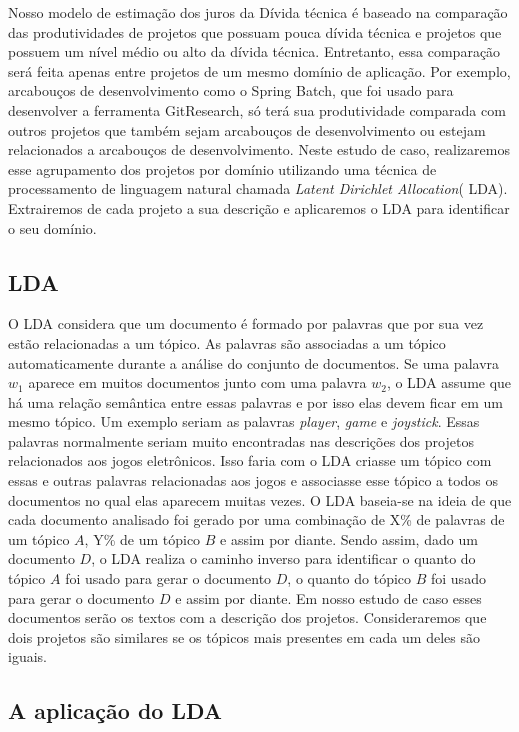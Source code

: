 Nosso modelo de estimação dos juros da Dívida técnica é baseado na comparação das produtividades de projetos que possuam pouca dívida técnica e projetos que possuem um nível médio ou alto da dívida técnica. Entretanto, essa comparação será feita apenas entre projetos de um mesmo domínio de aplicação. Por exemplo, arcabouços de desenvolvimento como o Spring Batch\cite{cogoluegnes2011spring}, que foi usado para desenvolver a ferramenta GitResearch, só terá sua produtividade comparada com outros projetos que também sejam arcabouços de desenvolvimento ou estejam relacionados a arcabouços de desenvolvimento.  Neste estudo de caso, realizaremos esse agrupamento dos projetos por domínio utilizando uma técnica de processamento de linguagem natural chamada \textit{Latent Dirichlet Allocation}( LDA). Extrairemos de cada projeto a sua descrição e aplicaremos o LDA para identificar o seu domínio.

\subsection{LDA}

O LDA considera que um documento é formado por palavras que por sua vez estão relacionadas a um tópico.  As palavras são associadas a um tópico automaticamente durante a análise do conjunto de documentos. Se uma palavra $w_1$ aparece em muitos documentos junto com uma palavra $w_2$, o LDA assume que há uma relação semântica entre essas palavras e por isso elas devem ficar em um mesmo tópico. Um exemplo seriam as palavras \textit{player}, \textit{game} e \textit{joystick}. Essas palavras normalmente seriam muito encontradas nas descrições dos projetos relacionados aos jogos eletrônicos. Isso faria com o LDA criasse um tópico com essas e outras palavras relacionadas aos jogos e associasse esse tópico a todos os documentos no qual elas aparecem muitas vezes. O LDA baseia-se na ideia de que cada documento analisado foi gerado por uma combinação de  X\% de palavras de um tópico $A$, Y\% de um tópico $B$ e assim por diante. Sendo assim, dado um documento $D$, o LDA realiza o caminho inverso  para identificar o quanto do tópico $A$ foi usado para gerar o documento $D$, o quanto do tópico $B$ foi usado para gerar o documento $D$ e assim por diante.  Em nosso estudo de caso esses documentos serão os textos com a descrição dos projetos. Consideraremos que dois projetos são similares se os tópicos mais presentes em cada um deles são iguais. 


\subsection{A aplicação do LDA}



